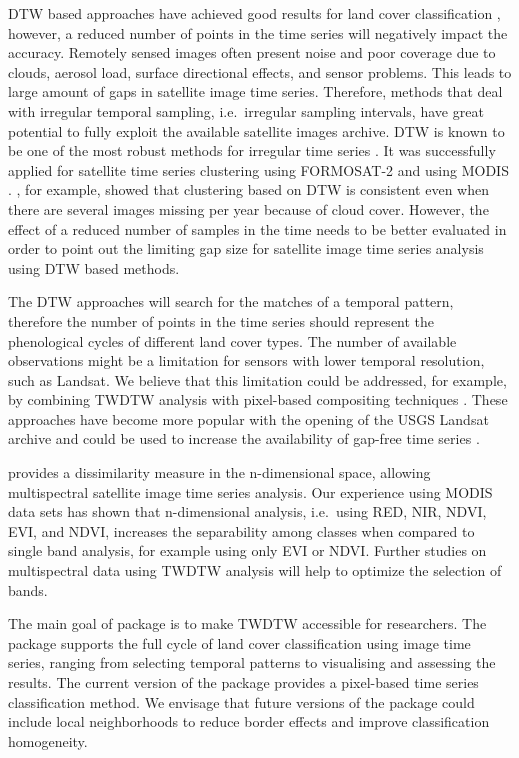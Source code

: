\documentclass[article,shortnames]{jss}
\begin{document}
DTW based approaches have achieved good results for land cover
classification \citep{Petitjean:2012, Maus:2016}, however, a reduced
number of points in the time series will negatively impact the accuracy.
Remotely sensed images often present noise and poor coverage due to
clouds, aerosol load, surface directional effects, and sensor problems.
This leads to large amount of gaps in satellite image time series.
Therefore, methods that deal with irregular temporal sampling,
i.e.~irregular sampling intervals, have great potential to fully exploit
the available satellite images archive. DTW is known to be one of the
most robust methods for irregular time series
\citep{Keogh:2005, Tormene:2009}. It was successfully applied for
satellite time series clustering using FORMOSAT-2 \citep{Petitjean:2012}
and using MODIS \citep{Maus:2016}. \citet{Petitjean:2012}, for example,
showed that clustering based on DTW is consistent even when there are
several images missing per year because of cloud cover. However, the
effect of a reduced number of samples in the time needs to be better
evaluated in order to point out the limiting gap size for satellite
image time series analysis using DTW based methods.

The DTW approaches will search for the matches of a temporal pattern,
therefore the number of points in the time series should represent the
phenological cycles of different land cover types. The number of
available observations might be a limitation for sensors with lower
temporal resolution, such as Landsat. We believe that this limitation
could be addressed, for example, by combining TWDTW analysis with
pixel-based compositing techniques \citep{Griffiths:2013, White:2014}.
These approaches have become more popular with the opening of the USGS
Landsat archive and could be used to increase the availability of
gap-free time series \citep{Gomez:2016}.

 provides a dissimilarity measure in the n-dimensional
space, allowing multispectral satellite image time series analysis. Our
experience using MODIS data sets has shown that n-dimensional analysis,
i.e.~using RED, NIR, NDVI, EVI, and NDVI, increases the separability
among classes when compared to single band analysis, for example using
only EVI or NDVI. Further studies on multispectral data using TWDTW
analysis will help to optimize the selection of bands.

The main goal of  package is to make TWDTW accessible for
researchers. The package supports the full cycle of land cover
classification using image time series, ranging from selecting temporal
patterns to visualising and assessing the results. The current version
of the  package provides a pixel-based time series
classification method. We envisage that future versions of the package
could include local neighborhoods to reduce border effects and improve
classification homogeneity.
\end{document}
